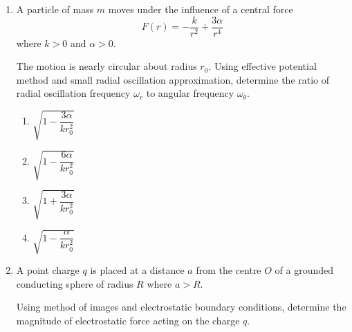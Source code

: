\documentclass[12pt]{article}
\begin{document}
\begin{enumerate}[leftmargin=*]
\begin{center}
\end{center}

\begin{enumerate}
\item $\displaystyle \frac{g\sin\theta}{\frac{7}{5}+\frac{M}{m}}$
\item $\displaystyle \frac{g\sin\theta}{\frac{7}{5}}$
\item $\displaystyle \frac{g\sin\theta}{2+\frac{M}{m}}$
\item $\displaystyle \frac{g\sin\theta}{\frac{5}{7}+\frac{M}{m}}$
\end{enumerate}

\item A particle of mass $m$ moves under the influence of a central force
\[
F(r)=-\frac{k}{r^2}+\frac{3\alpha}{r^4}
\]
where $k>0$ and $\alpha>0$.  

The motion is nearly circular about radius $r_0$.  
Using effective potential method and small radial oscillation approximation, determine the ratio of radial oscillation frequency $\omega_r$ to angular frequency $\omega_\theta$.

\begin{enumerate}
\item $\sqrt{1-\dfrac{3\alpha}{k r_0^2}}$
\item $\sqrt{1-\dfrac{6\alpha}{k r_0^2}}$
\item $\sqrt{1+\dfrac{3\alpha}{k r_0^2}}$
\item $\sqrt{1-\dfrac{\alpha}{k r_0^2}}$
\end{enumerate}

\item A point charge $q$ is placed at a distance $a$ from the centre $O$ of a grounded conducting sphere of radius $R$ where $a>R$.  

Using method of images and electrostatic boundary conditions, determine the magnitude of electrostatic force acting on the charge $q$.

\begin{center}
\end{center}


\end{enumerate}
\end{document}
